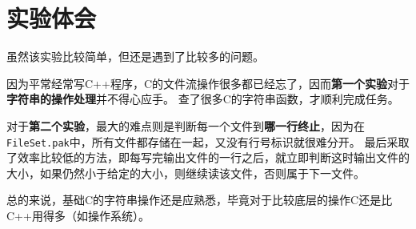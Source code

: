 \documentclass[logo,reportComp]{thesis}
\begin{document}
\section{实验体会}
虽然该实验比较简单，但还是遇到了比较多的问题。

因为平常经常写C++程序，C的文件流操作很多都已经忘了，因而\textbf{第一个实验}对于\textbf{字符串的操作处理}并不得心应手。
查了很多C的字符串函数，才顺利完成任务。

对于\textbf{第二个实验}，最大的难点则是判断每一个文件到\textbf{哪一行终止}，因为在\verb'FileSet.pak'中，所有文件都存储在一起，又没有行号标识就很难分开。
最后采取了效率比较低的方法，即每写完输出文件的一行之后，就立即判断这时输出文件的大小，如果仍然小于给定的大小，则继续读该文件，否则属于下一文件。

总的来说，基础C的字符串操作还是应熟悉，毕竟对于比较底层的操作C还是比C++用得多（如操作系统）。
\end{document}
